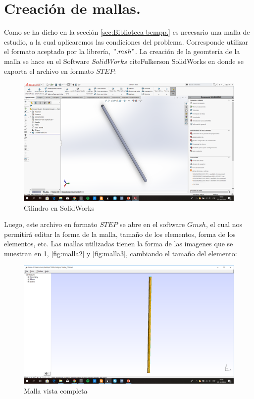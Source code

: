 \section{Creación de mallas.}\label{sec:Creacion de mallas.}
Como se ha dicho en la sección \ref{sec:Biblioteca bempp.} es necesario una malla de estudio, a la cual aplicaremos las condiciones del problema. Corresponde utilizar el formato aceptado por la librería, $".msh"$. La creación de la geomtería de la malla se hace en el Software $SolidWorks$ cite{Fulkerson SolidWorks} en  donde se exporta el archivo en formato $STEP$:
\begin{figure}[H]
\centering
\includegraphics[scale=0.8]{Imagenes/Cilindro STEP.png}
\caption{Cilindro en SolidWorks}
\end{figure}
Luego, este archivo en formato $STEP$ se abre en el software $Gmsh$, el cual nos permitirá editar la forma de la malla, tamaño de los elementos, forma de los elementos, etc. Las mallas utilizadas tienen la forma de las imagenes que se muestran en \ref{fig:malla1}, \ref{fig:malla2} y \ref{fig:malla3}, cambiando el tamaño del elemento:
\begin{figure}[H]
\centering
\includegraphics[scale=0.8]{Imagenes/malla1.png}
\caption{Malla vista completa}\label{fig:malla1}
\end{figure}
